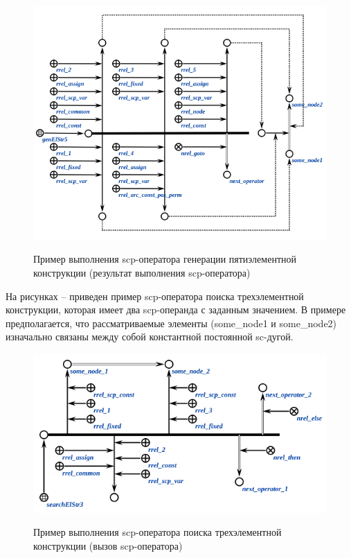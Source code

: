 \begin{figure}[H]
	\centering
	\caption{Пример выполнения scp-оператора генерации пятиэлементной конструкции (результат выполнения scp-оператора)}
	\includegraphics[scale=0.8]{images/part3/chapter_situation_management/genElStr5_fafaa_2.png}
	\label{fig:genElStr5_fafaa_2}
\end{figure}

На рисунках \textit{} -- \textit{} приведен пример scp-оператора поиска трехэлементной конструкции, которая имеет два scp-операнда с заданным значением. В примере предполагается, что рассматриваемые элементы (some\_node1 и some\_node2) изначально связаны между собой константной постоянной sc-дугой.

\begin{figure}[H]
	\centering
	\caption{Пример выполнения scp-оператора поиска трехэлементной конструкции (вызов scp-оператора)}
	\includegraphics[scale=0.8]{images/part3/chapter_situation_management/searchElStr3_faf.png}
	\label{fig:searchElStr3_faf}
\end{figure}

